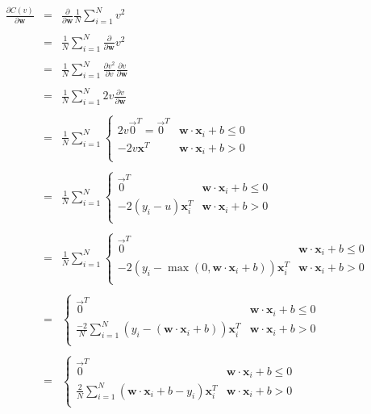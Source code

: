 \documentclass[11pt]{article}
\begin{document}
\begin{center}
\begin{eqnarray*}
 \frac{\partial C(v)}{\partial \mathbf{w}} & = & \frac{\partial }{\partial \mathbf{w}}\frac{1}{N} \sum_{i=1}^N v^2\\\\
 & = & \frac{1}{N} \sum_{i=1}^N \frac{\partial}{\partial \mathbf{w}} v^2\\\\
 & = & \frac{1}{N} \sum_{i=1}^N \frac{\partial v^2}{\partial v} \frac{\partial v}{\partial \mathbf{w}} \\\\
 & = & \frac{1}{N} \sum_{i=1}^N 2v \frac{\partial v}{\partial \mathbf{w}} \\\\
 & = & \frac{1}{N} \sum_{i=1}^N \begin{cases}
	2v\vec{0}^T = \vec{0}^T & \mathbf{w} \cdot \mathbf{x}_i + b \leq 0\\
	-2v\mathbf{x}^T & \mathbf{w} \cdot \mathbf{x}_i + b > 0\\
\end{cases}\\\\
 & = & \frac{1}{N} \sum_{i=1}^N \begin{cases}
	\vec{0}^T & \mathbf{w} \cdot \mathbf{x}_i + b \leq 0\\
	-2(y_i-u)\mathbf{x}_i^T & \mathbf{w} \cdot \mathbf{x}_i + b > 0\\
\end{cases}\\\\
 & = & \frac{1}{N} \sum_{i=1}^N \begin{cases}
	\vec{0}^T & \mathbf{w} \cdot \mathbf{x}_i + b \leq 0\\
	-2(y_i-\max(0, \mathbf{w}\cdot\mathbf{x}_i+b))\mathbf{x}_i^T & \mathbf{w} \cdot \mathbf{x}_i + b > 0\\
\end{cases}\\\\
 & = & \begin{cases}
	\vec{0}^T & \mathbf{w} \cdot \mathbf{x}_i + b \leq 0\\
	\frac{-2}{N} \sum_{i=1}^N (y_i-(\mathbf{w}\cdot\mathbf{x}_i+b))\mathbf{x}_i^T & \mathbf{w} \cdot \mathbf{x}_i + b > 0\\
\end{cases}\\\\
 & = & \begin{cases}
	\vec{0}^T & \mathbf{w} \cdot \mathbf{x}_i + b \leq 0\\
	\frac{2}{N} \sum_{i=1}^N (\mathbf{w}\cdot\mathbf{x}_i+b-y_i)\mathbf{x}_i^T & \mathbf{w} \cdot \mathbf{x}_i + b > 0\\
\end{cases}
\end{eqnarray*}
\end{center}
\end{document}
